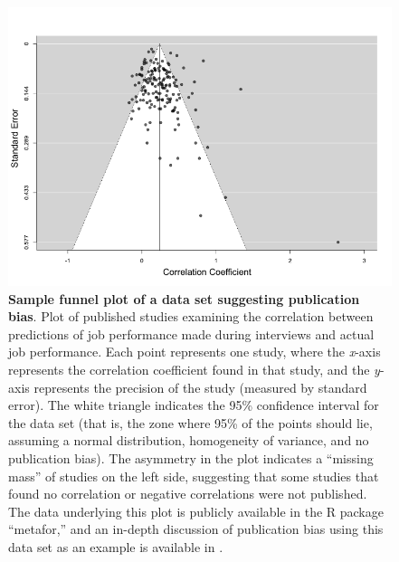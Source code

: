 \documentclass[twocolumn, serif, meta, authordate]{jote-article}
\begin{document}
\begin{figure}[h]
\centering 
\includegraphics[width=\columnwidth]{media/betternelson.pdf}
\caption{\textbf{Sample funnel plot of a data set suggesting publication bias}. Plot of published studies examining the correlation between predictions of job performance made during interviews and actual job performance. Each point represents one study, where the \emph{x}-axis represents the correlation coefficient found in that study, and the \emph{y}-axis represents the precision of the study (measured by standard error). The white triangle indicates the 95\% confidence interval for the data set (that is, the zone where 95\% of the points should lie, assuming a normal distribution, homogeneity of variance, and no publication bias). The asymmetry in the plot indicates a ``missing mass'' of studies on the left side, suggesting that some studies that found no correlation or negative correlations were not published. The data underlying this plot is publicly available in the R package ``metafor,'' and an in-depth discussion of publication bias using this data set as an example is available in \parencite{Rothstein2005}.}
\label{fig:figure1}
\end{figure}
\end{document}
